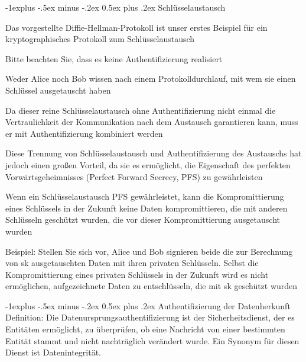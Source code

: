 \documentclass[a4paper]{article}
\makeatletter
\renewcommand{\subsection}{\@startsection{subsection}{2}{0mm}%
 {-1explus -.5ex minus -.2ex}%
 {0.5ex plus .2ex}%
 {\normalfont\normalsize\bfseries}}
\makeatother
\begin{document}
\begin{multicols}{3}
      \subsection{Schlüsselaustausch}
      \begin{itemize*}
            \item Das vorgestellte Diffie-Hellman-Protokoll ist unser erstes Beispiel für ein kryptographisches Protokoll zum Schlüsselaustausch
            \item Bitte beachten Sie, dass es keine Authentifizierung realisiert
            \begin{itemize*}
                  \item Weder Alice noch Bob wissen nach einem Protokolldurchlauf, mit wem sie einen Schlüssel ausgetauscht haben
                  \item Da dieser reine Schlüsselaustausch ohne Authentifizierung nicht einmal die Vertraulichkeit der Kommunikation nach dem Austausch garantieren kann, muss er mit Authentifizierung kombiniert werden
            \end{itemize*}
            \item Diese Trennung von Schlüsselaustausch und Authentifizierung des Austauschs hat jedoch einen großen Vorteil, da sie es ermöglicht, die Eigenschaft des perfekten Vorwärtsgeheimnisses (Perfect Forward Secrecy, PFS) zu gewährleisten
            \begin{itemize*}
                  \item Wenn ein Schlüsselaustausch PFS gewährleistet, kann die Kompromittierung eines Schlüssels in der Zukunft keine Daten kompromittieren, die mit anderen Schlüsseln geschützt wurden, die vor dieser Kompromittierung ausgetauscht wurden
                  \item Beispiel: Stellen Sie sich vor, Alice und Bob signieren beide die zur Berechnung von sk ausgetauschten Daten mit ihren privaten Schlüsseln. Selbst die Kompromittierung eines privaten Schlüssels in der Zukunft wird es nicht ermöglichen, aufgezeichnete Daten zu entschlüsseln, die mit sk geschützt wurden
            \end{itemize*}
      \end{itemize*}

      \subsection{Authentifizierung der Datenherkunft}
      Definition: Die Datenursprungsauthentifizierung ist der Sicherheitsdienst, der es Entitäten ermöglicht, zu überprüfen, ob eine Nachricht von einer bestimmten Entität stammt und nicht nachträglich verändert wurde. Ein Synonym für diesen Dienst ist Datenintegrität.


\end{multicols}
\end{document}
